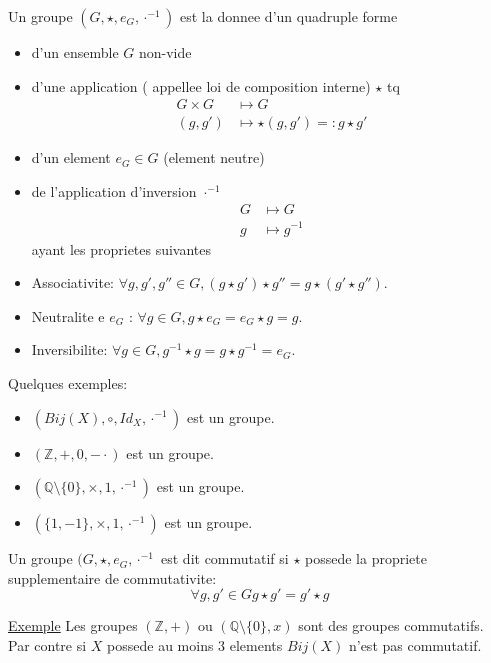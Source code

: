 \documentclass[../main.tex]{subfiles}
\begin{document}
\begin{defn}\label{defn:groupe_abstrait}
	Un groupe $(G,\star, e_G, \cdot^{-1})$ est la donnee d'un quadruple forme
	\begin{itemize}
		\item d'un ensemble $G$ non-vide\\
		\item d'une application ( appellee loi de composition interne) $\star$ tq
			\begin{align*}
				G \times G &\mapsto G\\
				( g,g') &\mapsto \star(g,g') =: g \star g'
			\end{align*}
		\item d'un element $e_G \in G$ (element neutre)\\
		\item de l'application d'inversion $\cdot^{-1}$
			\begin{align*}
			G &\mapsto G\\
			g & \mapsto g^{-1}	
			\end{align*}
		ayant les proprietes suivantes\\
	\item Associativite: $\forall g,g',g'' \in G, ( g\star g')\star g'' = g \star(g'\star g'')$.\\
	\item Neutralite e $e_G$ : $\forall g \in G, g \star e_G = e_G \star g = g$.\\
	\item Inversibilite: $\forall g \in G, g^{-1} \star g = g \star g^{-1} = e_G$.
	\end{itemize}
\end{defn}
Quelques exemples:
\begin{itemize}
	\item $(Bij(X), \circ, Id_X, \cdot^{-1}) $ est un groupe.\\
	\item $(\mathbb{Z}, +, 0, - \cdot) $ est un groupe.\\
	\item $( \mathbb{Q}\setminus \{0\}, \times, 1,  \cdot^{-1}) $ est un groupe.\\
	\item $( \{1,-1\}, \times, 1,  \cdot^{-1}) $ est un groupe.\\
\end{itemize}
\begin{defn}\label{defn:groupes_commutatifs}
	Un groupe $(G, \star, e_G, \cdot^{-1}$ est dit commutatif si $\star$ possede la propriete supplementaire de commutativite:
	\[ 
	\forall g, g' \in G  g\star g' = g' \star g
	\]
	
\end{defn}
\underline{Exemple} Les groupes $(\mathbb{Z},+)$ ou $(\mathbb{Q}\setminus \{0\},x)$ sont des groupes commutatifs.\\
Par contre si $X$ possede au moins 3 elements $Bij(X)$ n'est pas commutatif.


	
\end{document}
